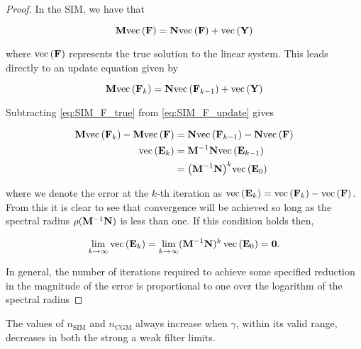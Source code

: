 \begin{proof}
    In the SIM, we have that 

\begin{equation}
    \label{eq:SIM_F_true}
\M \vecc{\F} =  \N \vecc{\F} + \vecc{\Y}
\end{equation}

where $\text{\textup{vec}}\left(\mathbf{F}\right)$ represents the true solution to the linear system. This leads directly to an update equation given by

\begin{equation}
    \label{eq:SIM_F_update}
\M \vecc{\F_k} = \N \vecc{\F_{k-1}} + \vecc{\Y}
\end{equation}

Subtracting \cref{eq:SIM_F_true} from \cref{eq:SIM_F_update} gives

\begin{align}
    \mathbf{M} \text{\textup{vec}}\left(\mathbf{F}_k\right) - \mathbf{M} \text{\textup{vec}}\left(\mathbf{F}\right) &= \mathbf{N} \text{\textup{vec}}\left(\mathbf{F}_{k-1}\right) - \mathbf{N} \text{\textup{vec}}\left(\mathbf{F}\right)  \notag \\
    \text{\textup{vec}}\left(\mathbf{E}_k\right) &= \mathbf{M}^{-1} \mathbf{N} \text{\textup{vec}}\left(\mathbf{E}_{k-1}\right) \notag \\
     &= \big( \mathbf{M}^{-1} \mathbf{N} \big)^{k} \text{\textup{vec}}\left(\mathbf{E}_{0}\right)
\end{align}

where we denote the error at the $k$-th iteration as $\text{\textup{vec}}\left(\mathbf{E}_k\right) = \text{\textup{vec}}\left(\mathbf{F}_k\right) - \text{\textup{vec}}\left(\mathbf{F}\right)$. From this it is clear to see that convergence will be achieved so long as the spectral radius $\rho(\mathbf{M}^{-1}\mathbf{N})$ is less than one. If this condition holds then,

\begin{equation}
    \lim_{k \rightarrow \infty} \text{\textup{vec}}\left(\mathbf{E}_{k}\right) = \lim_{k \rightarrow \infty} (\mathbf{M}^{-1} \mathbf{N})^{k} \, \text{\textup{vec}}\left(\mathbf{E}_0\right) = \mathbf{0} .
\end{equation}

In general, the number of iterations required to achieve some specified reduction in the magnitude of the error is proportional to one over the logarithm of the spectral radius
\end{proof}

\begin{theorem}
    \label{the:gamma_deriv_negative}
    The values of $n_{\text{SIM}}$ and $n_{\text{CGM}}$ always increase when $\gamma$, within its valid range, decreases in both the strong a weak filter limits. 
\end{theorem}

